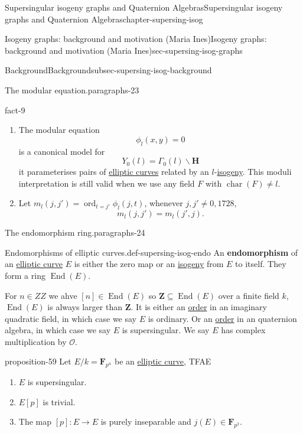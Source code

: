 \documentclass[oneside,10pt,]{book}
\newcommand{\terminology}[1]{\textbf{#1}}
\numberwithin{equation}{section}
\newcommand{\lb}{[}
\newcommand{\rb}{]}
\newcommand{\ZZ}{\mathbf{Z}}
\newcommand{\HH}{\mathbf{H}}
\newcommand{\FF}{\mathbf{F}}
\newcommand{\ints}{\mathcal{O}}
\DeclareMathOperator{\End}{End}
\DeclareMathOperator{\characteristic}{char}
\DeclareMathOperator{\ord}{ord}
\begin{document}
\begin{chapterptx}{Supersingular isogeny graphs and Quaternion Algebras}{}{Supersingular isogeny graphs and Quaternion Algebras}{}{}{chapter-supersing-isog}
\begin{sectionptx}{Isogeny graphs: background and motivation (Maria Ines)}{}{Isogeny graphs: background and motivation (Maria Ines)}{}{}{sec-supersing-isog-graphs}
\begin{subsectionptx}{Background}{}{Background}{}{}{subsec-supersing-isog-background}
\begin{paragraphs}{The modular equation.}{paragraphs-23}
\begin{fact}{}{}{fact-9}
\begin{enumerate}
\item\hypertarget{li-189}{}The modular equation%
\begin{equation*}
\phi_l (x,y) = 0
\end{equation*}
is a canonical model for%
\begin{equation*}
Y_0(l) = \Gamma_0(l) \backslash \HH
\end{equation*}
it parameterises pairs of \hyperref[def-supersing-isog-ec]{elliptic curves} related by an \(l\)-\hyperref[def-supersing-isog-isog]{isogeny}. This moduli interpretation is still valid when we use any field \(F\) with \(\characteristic(F) \ne l\).%
\item\hypertarget{li-190}{}Let \(m_l(j,j') = \ord_{t = j'} \phi_l(j,t)\), whenever \(j,j' \ne 0,1728\),%
\begin{equation*}
m_l(j,j') = m_l(j',j)\text{.}
\end{equation*}
%
\end{enumerate}
%
\end{fact}
\end{paragraphs}%
\begin{paragraphs}{The endomorphism ring.}{paragraphs-24}%
\begin{definition}{Endomorphisms of elliptic curves.}{def-supersing-isog-endo}%
\hypertarget{p-797}{}%
An \terminology{endomorphism} of an \hyperref[def-supersing-isog-ec]{elliptic curve} \(E\) is either the zero map or an \hyperref[def-supersing-isog-isog]{isogeny} from \(E\) to itself. They form a ring \(\End(E)\).%
\end{definition}
\hypertarget{p-798}{}%
For \(n \in ZZ\) we ahve \(\lb n \rb \in \End(E)\) so \(\ZZ \subseteq \End(E)\) over a finite field \(k\), \(\End(E)\) is always larger than \(\ZZ\). It is either an \hyperref[def-order-quaternion]{order} in an imaginary quadratic field, in which case we say \(E\) is ordinary. Or an \hyperref[def-order-quaternion]{order} in an quaternion algebra, in which case we say \(E\) is supersingular. We say \(E\) has complex multiplication by \(\ints\).%
\begin{proposition}{}{}{proposition-59}%
\hypertarget{p-799}{}%
Let \(E/k = \FF_{p^n}\) be an \hyperref[def-supersing-isog-ec]{elliptic curve}, TFAE\leavevmode%
\begin{enumerate}
\item\hypertarget{li-191}{}\(E\) is supersingular.%
\item\hypertarget{li-192}{}\(E\lb p\rb\) is trivial.%
\item\hypertarget{li-193}{}The map \(\lb p\rb \colon E\to E\) is purely inseparable and \(j(E) \in \FF_{p^2}\).%

\end{enumerate}
\end{proposition}
\end{paragraphs}
\end{subsectionptx}
\end{sectionptx}
\end{chapterptx}
\end{document}
